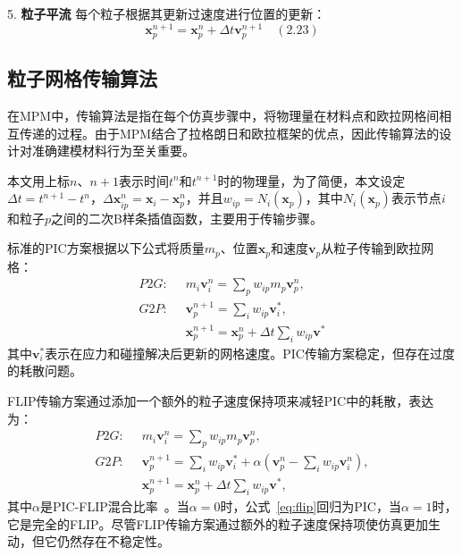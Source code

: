 5. \textbf{粒子平流}
每个粒子根据其更新过速度进行位置的更新：
\[
\mathbf{x}_p^{n + 1} = \mathbf{x}_p^n + \Delta t \mathbf{v}_p^{n + 1} \quad (2.23)
\]


\subsection{粒子网格传输算法}
在MPM中，传输算法是指在每个仿真步骤中，将物理量在材料点和欧拉网格间相互传递的过程。由于MPM结合了拉格朗日和欧拉框架的优点，因此传输算法的设计对准确建模材料行为至关重要。

本文用上标$n$、$n+1$表示时间$t^n$和$t^{n+1}$时的物理量，为了简便，本文设定$\Delta t=t^{n+1}-t^n$，$\Delta \mathbf{x}_{ip}^{n}=\mathbf{x}_i-\mathbf{x}_p^n$，并且$w_{ip}=N_i(\mathbf{x}_p)$，其中$N_i(\mathbf{x}_p)$表示节点$i$和粒子$p$之间的二次B样条插值函数，主要用于传输步骤。

标准的PIC方案根据以下公式将质量$m_p$、位置$\mathbf{x}_p$和速度$\mathbf{v}_p$从粒子传输到欧拉网格：
\begin{equation}
    \begin{aligned}
    P2G: \;\;    
    &m_i\mathbf{v}_i^n =\sum_{p}w_{ip}m_p\mathbf{v}_p^n, \\
    G2P:\;\; & \mathbf{v}_p^{n+1}=\sum_iw_{ip}\mathbf{v}_i^*,\\
    &\mathbf{x}_p^{n+1}=\mathbf{x}_p^n+\Delta t\sum_iw_{ip}\mathbf{v^*}
    \end{aligned}
\end{equation}
其中$\mathbf{v}_i^*$表示在应力和碰撞解决后更新的网格速度。PIC传输方案稳定，但存在过度的耗散问题。

FLIP传输方案\cite{zhu2005animating}通过添加一个额外的粒子速度保持项来减轻PIC中的耗散，表达为：
\begin{equation}
    \begin{aligned}
    P2G: \;\;    
    &m_i\mathbf{v}_i^n =\sum_{p}w_{ip}m_p\mathbf{v}_p^n, \\
    G2P:\;\; & \mathbf{v}_p^{n+1}=\sum_iw_{ip}\mathbf{v}_i^* + \alpha(\mathbf{v}_p^n-\sum_iw_{ip}\mathbf{v}_i^n),\\
    &\mathbf{x}_p^{n+1}=\mathbf{x}_p^n+\Delta t\sum_iw_{ip}\mathbf{v^*},
    \end{aligned}
    \label{eq:flip}
\end{equation}
其中$\alpha$是PIC-FLIP混合比率~\cite{bridson2015fluid}。当$\alpha=0$时，公式~\eqref{eq:flip}回归为PIC，当$\alpha=1$时，它是完全的FLIP。尽管FLIP传输方案通过额外的粒子速度保持项使仿真更加生动，但它仍然存在不稳定性。

